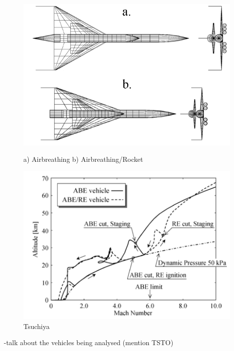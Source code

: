 \begin{figure}
	\centering
	\begin{minipage}[b]{0.45\textwidth}
		\centering
		\includegraphics[width=\linewidth]{"figures/2_literature-review/Tsuchiya Vehicles"}
		\caption{a) Airbreathing b) Airbreathing/Rocket}
		\label{fig:WilhiteBoosterVehicle}
	\end{minipage}	
	\begin{minipage}[b]{0.45\textwidth}
		\includegraphics[width=\linewidth]{"figures/2_literature-review/Tsuchiya"}
		\caption{Tsuchiya}
		\label{fig:WilHiteBoosterTrajectory}
	\end{minipage}
\end{figure}

-talk about the vehicles being analysed (mention TSTO)

